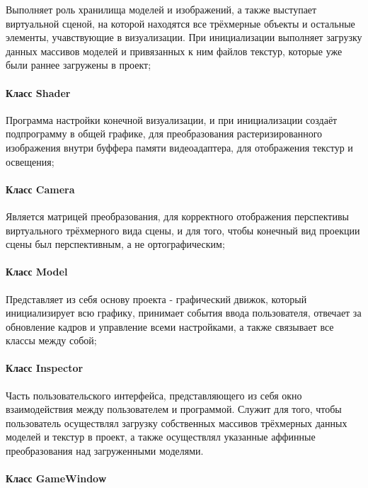 Выполняет роль хранилища моделей и изображений, а также выступает виртуальной сценой, на которой находятся все трёхмерные объекты и остальные элементы, учавствующие в визуализации. При инициализации выполняет загрузку данных массивов моделей и привязанных к ним файлов текстур, которые уже были раннее загружены в проект;

\paragraph{Класс Shader}

Программа настройки конечной визуализации, и при инициализации создаёт подпрограмму в общей графике, для преобразования растеризированного изображения внутри буффера памяти видеоадаптера, для отображения текстур и освещения;

\paragraph{Класс Camera}

Является матрицей преобразования, для корректного отображения перспективы виртуального трёхмерного вида сцены, и для того, чтобы конечный вид проекции сцены был перспективным, а не ортографическим;

\paragraph{Класс Model}

Представляет из себя основу проекта - графический движок, который инициализирует всю графику, принимает события ввода пользователя, отвечает за обновление кадров и управление всеми настройками, а также связывает все классы между собой;

\paragraph{Класс Inspector}

Часть пользовательского интерфейса, представляющего из себя окно взаимодействия между пользователем и программой. Служит для того, чтобы пользователь осуществлял загрузку собственных массивов трёхмерных данных моделей и текстур в проект, а также осуществлял указанные аффинные преобразования над загруженными моделями.

\paragraph{Класс GameWindow}

